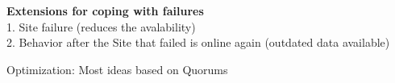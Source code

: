 \documentclass[a4paper,12pt]{article}%
\begin{document}
 {\bf Extensions for coping with failures} \\
 1. Site failure (reduces the avalability) \\
 2. Behavior after the Site that failed is online again (outdated data available)
 
 
 
 Optimization: Most ideas based on Quorums
 
 
 
 
 
 
 
 
 
 
 
 
 
 
 
 
 
 
 
 
 
 
 
 
 
 
 
 
 
 
 
\end{document}
